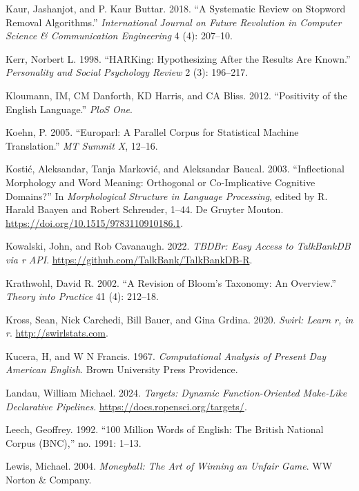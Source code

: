 \documentclass[
  letterpaper,
]{latex/krantz}
\newlength{\cslhangindent}
\newenvironment{CSLReferences}[2] %
 {\begin{list}{}{%
  \setlength{\itemindent}{0pt}
  \setlength{\leftmargin}{0pt}
  \setlength{\parsep}{0pt}
  \ifodd #1
   \setlength{\leftmargin}{\cslhangindent}
   \setlength{\itemindent}{-1\cslhangindent}
  \fi
  \setlength{\itemsep}{#2\baselineskip}}}
 {\end{list}}
\theoremstyle{definition}
\theoremstyle{remark}
\begin{document}
\begin{CSLReferences}{1}{0}
Kaur, Jashanjot, and P. Kaur Buttar. 2018. {``A Systematic Review on
Stopword Removal Algorithms.''} \emph{International Journal on Future
Revolution in Computer Science \& Communication Engineering} 4 (4):
207--10.

Kerr, Norbert L. 1998. {``HARKing: Hypothesizing After the Results Are
Known.''} \emph{Personality and Social Psychology Review} 2 (3):
196--217.

Kloumann, IM, CM Danforth, KD Harris, and CA Bliss. 2012. {``Positivity
of the English Language.''} \emph{PloS One}.

Koehn, P. 2005. {``Europarl: A Parallel Corpus for Statistical Machine
Translation.''} \emph{MT Summit X}, 12--16.

Kostić, Aleksandar, Tanja Marković, and Aleksandar Baucal. 2003.
{``Inflectional Morphology and Word Meaning: Orthogonal or
Co-Implicative Cognitive Domains?''} In \emph{Morphological Structure in
Language Processing}, edited by R. Harald Baayen and Robert Schreuder,
1--44. De Gruyter Mouton. \url{https://doi.org/10.1515/9783110910186.1}.

Kowalski, John, and Rob Cavanaugh. 2022. \emph{TBDBr: Easy Access to
TalkBankDB via r API}. \url{https://github.com/TalkBank/TalkBankDB-R}.

Krathwohl, David R. 2002. {``A Revision of Bloom's Taxonomy: An
Overview.''} \emph{Theory into Practice} 41 (4): 212--18.

Kross, Sean, Nick Carchedi, Bill Bauer, and Gina Grdina. 2020.
\emph{Swirl: Learn r, in r}. \url{http://swirlstats.com}.

Kucera, H, and W N Francis. 1967. \emph{Computational Analysis of
Present Day American English}. Brown University Press Providence.

Landau, William Michael. 2024. \emph{Targets: Dynamic Function-Oriented
Make-Like Declarative Pipelines}.
\url{https://docs.ropensci.org/targets/}.

Leech, Geoffrey. 1992. {``100 Million Words of English: The British
National Corpus (BNC),''} no. 1991: 1--13.

Lewis, Michael. 2004. \emph{Moneyball: The Art of Winning an Unfair
Game}. WW Norton \& Company.


\end{CSLReferences}
\end{document}
